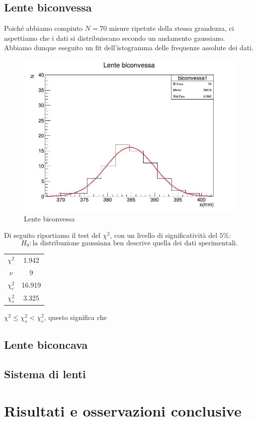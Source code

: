 \documentclass[a4paper]{article}
\begin{document}
    \subsection{Lente biconvessa}
    Poiché abbiamo compiuto $N=70$ misure ripetute della stessa grandezza, ci aspettiamo che i dati si distribuiscano secondo un andamento gaussiano. Abbiamo dunque eseguito un fit dell'istogramma delle frequenze assolute dei dati.
    \begin{figure}[H]
    	\centering
    	\includegraphics[width=0.75\linewidth]{histo1.jpg}
    	\caption{Lente biconvessa}
    	\label{fig:biconvessa}
    \end{figure}
    Di seguito riportiamo il test del $\chi^2$, con un livello di significatività del $5\%$:
    \[
    H_0: \text{la distribuzione gaussiana ben descrive quella dei dati sperimentali.}
    \]
    \begin{table}[H]
    	\centering
    	\begin{tabular}{|c|c|}
    		\hline
    		$\chi^2$ & 1.942 \\
    		$\nu$ & 9 \\
    		$\chi^2_c$ & 16.919\\
    		$\chi^2_s$ & 3.325\\ \hline
    	\end{tabular}
    	\label{tab:chi-quadro-biconvessa}
    \end{table}
    $\chi^2\leq\chi^2_s<\chi^2_c$, questo significa che 
    \subsection{Lente biconcava}
    \subsection{Sistema di lenti}
\section{Risultati e osservazioni conclusive}
\end{document}

